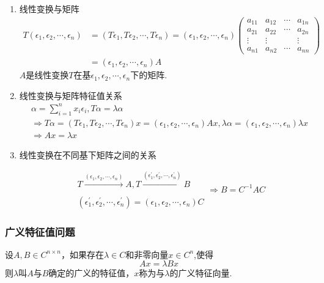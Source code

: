 \begin{enumerate}
	\item \textcolor{ecolor}{线性变换与矩阵}
	\[
	\begin{split}
		T(\epsilon_1,\epsilon_2,\cdots, \epsilon_n)&=	(T\epsilon_1,T\epsilon_2,\cdots, T\epsilon_n)
		=(\epsilon_1,\epsilon_2,\cdots, \epsilon_n)
		\begin{pmatrix}
			a_{11}&a_{12}&\cdots&a_{1n}\\ 
			a_{21}&a_{22}&\cdots&a_{2n}\\ 
			\vdots&\vdots&&\vdots\\ 
			a_{n1}&a_{n2}&\cdots&a_{nn}
	   \end{pmatrix}\\
   &=(\epsilon_1,\epsilon_2,\cdots, \epsilon_n)A
	\end{split}
	\]
	$A$是线性变换$T$在基$\epsilon_1,\epsilon_2,\cdots, \epsilon_n$下的矩阵.
	\item \textcolor{ecolor}{线性变换与矩阵特征值关系}
	\[
	\begin{split}
	&\alpha=\sum\limits_{i=1}^{n}x_i\epsilon
	_i,T\alpha=\lambda\alpha\\
	&\Rightarrow T\alpha=(T\epsilon_1,T\epsilon_2,\cdots, T\epsilon_n)x=(\epsilon_1,\epsilon_2,\cdots, \epsilon_n)Ax,\lambda\alpha=(\epsilon_1,\epsilon_2,\cdots, \epsilon_n)\lambda x\\
	&\Rightarrow Ax=\lambda x
\end{split}
	\]
	   \item \textcolor{ecolor}{线性变换在不同基下矩阵之间的关系}
	\begin{theorem}
		\[
		\begin{split}
			&T\xrightarrow[]{(\epsilon_1,\epsilon_2,\cdots, \epsilon_n)}A,T\xrightarrow[]{(\epsilon_1^{'},\epsilon_2^{'},\cdots, \epsilon_n^{'})}B\\
			&(\epsilon_1^{'},\epsilon_2^{'},\cdots, \epsilon_n^{'})=(\epsilon_1,\epsilon_2,\cdots, \epsilon_n)C
		\end{split}\Rightarrow B=C^{-1}AC
		\]
	\end{theorem}
\end{enumerate}

\subsubsection{广义特征值问题}
\begin{definition}
	设$A,B\in C^{n\times n}$，如果存在$\lambda \in C$和非零向量$x \in C^n$,使得
	\[
	Ax=\lambda Bx
	\]
	则$\lambda$叫$A$与$B$确定的广义的特征值，$x$称为与$\lambda$的广义特征向量.
\end{definition}

